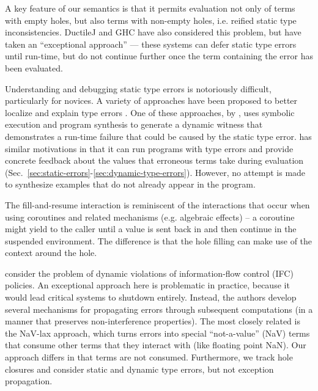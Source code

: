 
A key feature of our semantics is that it permits evaluation not only of terms with empty holes, but also terms with non-empty holes, i.e. reified static type inconsistencies. DuctileJ \cite{Bayne:2011:ASD:1985793.1985864} and GHC \cite{DBLP:conf/icfp/VytiniotisJM12} 
have also considered this problem, but have taken
an ``exceptional approach'' --- these systems can defer static type errors until run-time, but do not continue further once the term containing the error
 has been evaluated.

Understanding and debugging static type errors is notoriously difficult,
particularly for novices.
%
A variety of approaches have been
proposed to better localize
and explain type errors \cite{Seminal,ChenErwig2014,DBLP:journals/jfp/ChenE18,Pavlinovic2015,sherrloc}.
%
One of these approaches, by \citet{Seidel2016},  uses symbolic execution and program synthesis to generate a dynamic witness
that demonstrates a run-time failure that could be caused by the static type error.
%
\HazelnutLive{} has similar motivations in that it can run programs with type errors  and provide concrete feedback about the values that erroneous terms take during evaluation (Sec.~\ref{sec:static-errors}-\ref{sec:dynamic-type-errors}). However, no attempt is made to synthesize examples that do not already appear in the program. 
%

The fill-and-resume interaction is reminiscent of the interactions that occur when using coroutines \cite{DBLP:conf/ifip/KahnM77} and related mechanisms (e.g. algebraic effects) --  a coroutine might yield to the caller until a value is sent back in and then continue in the suspended environment. The difference is that 
the hole filling can make use of the context
around the hole. 

\citet{DBLP:conf/sp/HritcuGKPM13} consider the problem of dynamic violations of information-flow control (IFC) policies. An exceptional approach here is problematic in practice, because it would lead critical systems to shutdown entirely. Instead, the authors develop several mechanisms for 
propagating errors through subsequent computations (in a manner that preserves non-interference properties). The most closely related is the NaV-lax approach, which turns errors into special ``not-a-value'' (NaV) terms that consume other terms that they interact with (like floating point NaN). Our approach differs in that terms are not consumed. Furthermore, we track hole closures and consider static and dynamic type errors, but not exception propagation.  

